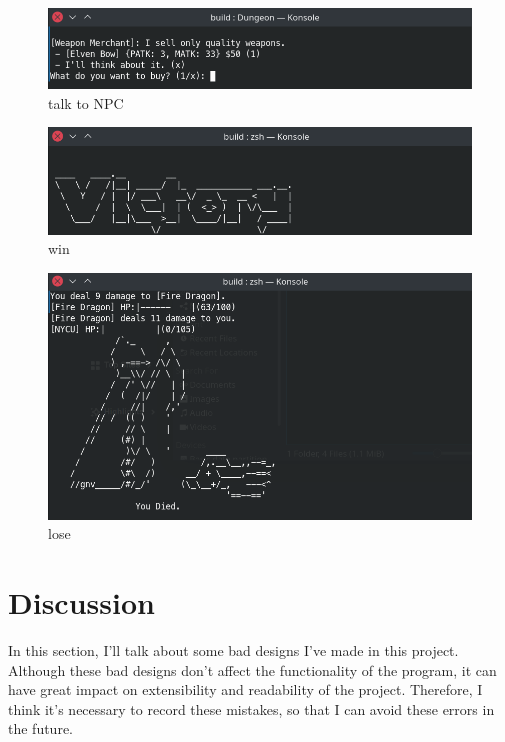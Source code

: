 \documentclass{article}
\begin{document}
\begin{figure}[H]
    \centering
    \includegraphics[width=0.7\linewidth]{talk_npc}
    \caption{talk to NPC}
\end{figure}
\begin{figure}[H]
    \centering
    \includegraphics[width=0.7\linewidth]{victory}
    \caption{win}
\end{figure}
\begin{figure}[H]
    \centering
    \includegraphics[width=0.7\linewidth]{lose}
    \caption{lose}
\end{figure}
    
\section{Discussion}

    In this section, I'll talk about some bad designs I've made in this project. Although these bad designs don't affect the functionality of the program, it can have great impact on extensibility and readability of the project. Therefore, I think it's necessary to record these mistakes, so that I can avoid these errors in the future.
\end{document}
